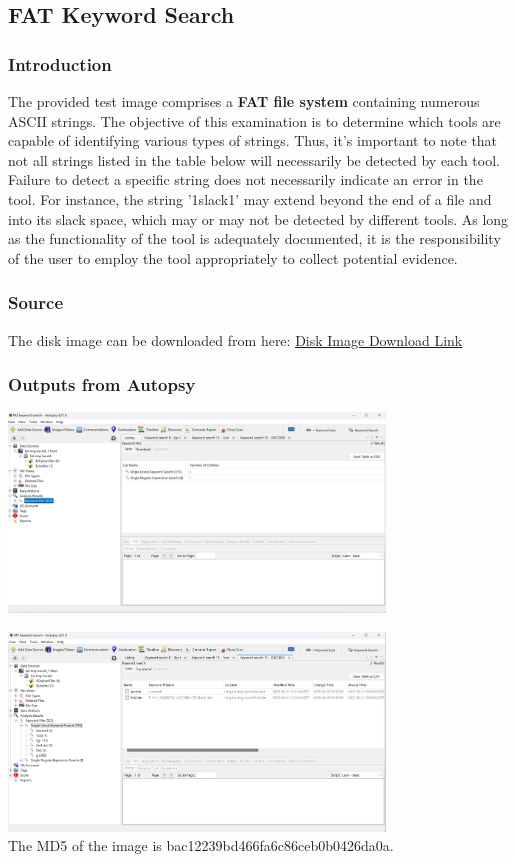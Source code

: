 \documentclass{extarticle}
\begin{document}
\subsection{FAT Keyword Search}
\subsubsection*{Introduction}
The provided test image comprises a \textbf{FAT file system} containing numerous ASCII strings. The objective of this examination is to determine which tools are capable of identifying various types of strings. Thus, it's important to note that not all strings listed in the table below will necessarily be detected by each tool. Failure to detect a specific string does not necessarily indicate an error in the tool. For instance, the string '1slack1' may extend beyond the end of a file and into its slack space, which may or may not be detected by different tools. As long as the functionality of the tool is adequately documented, it is the responsibility of the user to employ the tool appropriately to collect potential evidence.

\subsubsection*{Source}
The disk image can be downloaded from here: \href{http://prdownloads.sourceforge.net/dftt/2-kwsrch-fat.zip?download}{Disk Image Download Link}

\subsubsection*{Outputs from Autopsy}
\begin{center}
    \includegraphics[width=0.75\textwidth]{6/6.2/Search Results for keyword.png}
\end{center}

\begin{center}
    \includegraphics[width=0.75\textwidth]{6/6.2/Search Results for keyword _second_.png} \\
    The MD5 of the image is bac12239bd466fa6c86ceb0b0426da0a.
\end{center}
\end{document}
